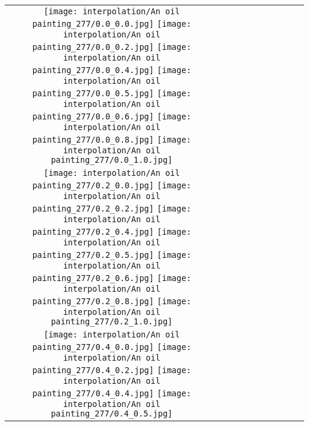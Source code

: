 \documentclass[10pt,twocolumn,letterpaper]{article}
\begin{document}
\begin{figure*}[tb!]
{\begin{tabular}{c c c c c c c c c c}
\end{tabular}}
\vspace{-0.8cm}
\hspace{20pt}
\label{fig:glideablation13}
\vspace{-2mm}
\end{figure*} \begin{figure*}[tb!]
    \centering
    \setlength{\tabcolsep}{0.5pt}
    {\small
    \renewcommand{\arraystretch}{0.5} 
    \begin{tabular}{c c c c c c c c c c}
    \captionsetup{type=figure, font=scriptsize}
    \raisebox{0.1in}{\rotatebox{90}{\small \emph{$0.0$}
 }}
  \texttt{[image: interpolation/An oil painting\_277/0.0\_0.0.jpg]}
  \texttt{[image: interpolation/An oil painting\_277/0.0\_0.2.jpg]}
  \texttt{[image: interpolation/An oil painting\_277/0.0\_0.4.jpg]}
  \texttt{[image: interpolation/An oil painting\_277/0.0\_0.5.jpg]}
  \texttt{[image: interpolation/An oil painting\_277/0.0\_0.6.jpg]}
  \texttt{[image: interpolation/An oil painting\_277/0.0\_0.8.jpg]}
  \texttt{[image: interpolation/An oil painting\_277/0.0\_1.0.jpg]}
 \tabularnewline
     \raisebox{0.1in}{\rotatebox{90}{\small \emph{$0.2$}
 }}
  \texttt{[image: interpolation/An oil painting\_277/0.2\_0.0.jpg]}
  \texttt{[image: interpolation/An oil painting\_277/0.2\_0.2.jpg]}
  \texttt{[image: interpolation/An oil painting\_277/0.2\_0.4.jpg]}
  \texttt{[image: interpolation/An oil painting\_277/0.2\_0.5.jpg]}
  \texttt{[image: interpolation/An oil painting\_277/0.2\_0.6.jpg]}
  \texttt{[image: interpolation/An oil painting\_277/0.2\_0.8.jpg]}
  \texttt{[image: interpolation/An oil painting\_277/0.2\_1.0.jpg]}
\tabularnewline
    \raisebox{0.1in}{\rotatebox{90}{\small \emph{$0.4$}
 }}
  \texttt{[image: interpolation/An oil painting\_277/0.4\_0.0.jpg]}
  \texttt{[image: interpolation/An oil painting\_277/0.4\_0.2.jpg]}
  \texttt{[image: interpolation/An oil painting\_277/0.4\_0.4.jpg]}
  \texttt{[image: interpolation/An oil painting\_277/0.4\_0.5.jpg]}

\end{tabular}}
\end{figure*}
\end{document}
